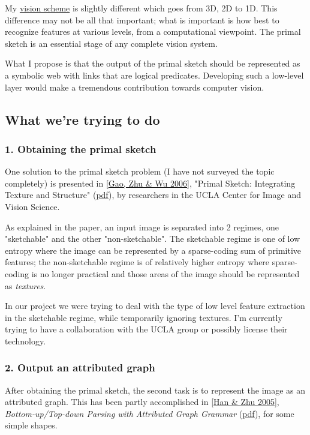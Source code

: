 My \href{Vis-BasicScheme.htm}{vision scheme} is slightly different which goes from 3D, 2D to 1D. This difference may not be all that important; what is important is how best to recognize features at various levels, from a computational viewpoint. The primal sketch is an essential stage of any complete vision system.

What I propose is that the output of the primal sketch should be represented as a symbolic web with links that are logical predicates. Developing such a low-level layer would make a tremendous contribution towards computer vision.

\subsection{What we're trying to do }

\subsubsection{1. Obtaining the primal sketch }

One solution to the primal sketch problem (I have not surveyed the topic completely) is presented in [\hyperlink{Ref}{Gao, Zhu \& Wu 2006}], "Primal Sketch: Integrating Texture and Structure" (\href{http://www.stat.ucla.edu/~sczhu/papers/primal_sketch.pdf}{pdf}), by researchers in the UCLA Center for Image and Vision Science.

As explained in the paper, an input image is separated into 2 regimes, one "sketchable" and the other "non-sketchable". The sketchable regime is one of low entropy where the image can be represented by a sparse-coding sum of primitive features; the non-sketchable regime is of relatively higher entropy where sparse-coding is no longer practical and those areas of the image should be represented as \emph{textures}.

In our project we were trying to deal with the type of low level feature extraction in the sketchable regime, while temporarily ignoring textures. I'm currently trying to have a collaboration with the UCLA group or possibly license their technology.

\subsubsection{2. Output an attributed graph}

After obtaining the primal sketch, the second task is to represent the image as an attributed graph. This has been partly accomplished in [\hyperlink{Ref}{Han \& Zhu 2005}], \emph{Bottom-up/Top-down Parsing with Attributed Graph Grammar} (\href{http://www.stat.ucla.edu/~sczhu/papers/PAMI_Grammar_rectangle.pdf}{pdf}), for some simple shapes.

